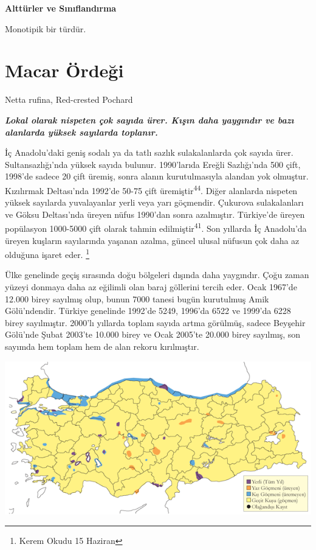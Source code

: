\documentclass[
  letterpaper,
  DIV=11,
  numbers=noendperiod]{scrreprt}
\begin{document}
\textbf{Alttürler ve Sınıflandırma}

Monotipik bir türdür.

\hypertarget{macar-uxf6rdeux11fi}{%
\section{Macar Ördeği}\label{macar-uxf6rdeux11fi}}

Netta rufina, Red-crested Pochard

\textbf{\emph{Lokal olarak nispeten çok sayıda ürer. Kışın daha
yaygındır ve bazı alanlarda yüksek sayılarda toplanır.}}

İç Anadolu'daki geniş sodalı ya da tatlı sazlık sulakalanlarda çok
sayıda ürer. Sultansazlığı'nda yüksek sayıda bulunur. 1990'larıda Ereğli
Sazlığı'nda 500 çift, 1998'de sadece 20 çift üremiş, sonra alanın
kurutulmasıyla alandan yok olmuştur. Kızılırmak Deltası'nda 1992'de
50-75 çift üremiştir\textsuperscript{44}. Diğer alanlarda nispeten
yüksek sayılarda yuvalayanlar yerli veya yarı göçmendir. Çukurova
sulakalanları ve Göksu Deltası'nda üreyen nüfus 1990'dan sonra
azalmıştır. Türkiye'de üreyen popülasyon 1000-5000 çift olarak tahmin
edilmiştir\textsuperscript{41}. Son yıllarda İç Anadolu'da üreyen
kuşların sayılarında yaşanan azalma, güncel ulusal nüfusun çok daha az
olduğuna işaret eder. \footnote{Kerem Okudu 15 Haziran}

Ülke genelinde geçiş sırasında doğu bölgeleri dışında daha yaygındır.
Çoğu zaman yüzeyi donmaya daha az eğilimli olan baraj göllerini tercih
eder. Ocak 1967'de 12.000 birey sayılmış olup, bunun 7000 tanesi bugün
kurutulmuş Amik Gölü'ndendir. Türkiye genelinde 1992'de 5249, 1996'da
6522 ve 1999'da 6228 birey sayılmıştır. 2000'lı yıllarda toplam sayıda
artma görülmüş, sadece Beyşehir Gölü'nde Şubat 2003'te 10.000 birey ve
Ocak 2005'te 20.000 birey sayılmış, son sayımda hem toplam hem de alan
rekoru kırılmıştır.

\includegraphics{images/harita_Page_022.png}
\end{document}
